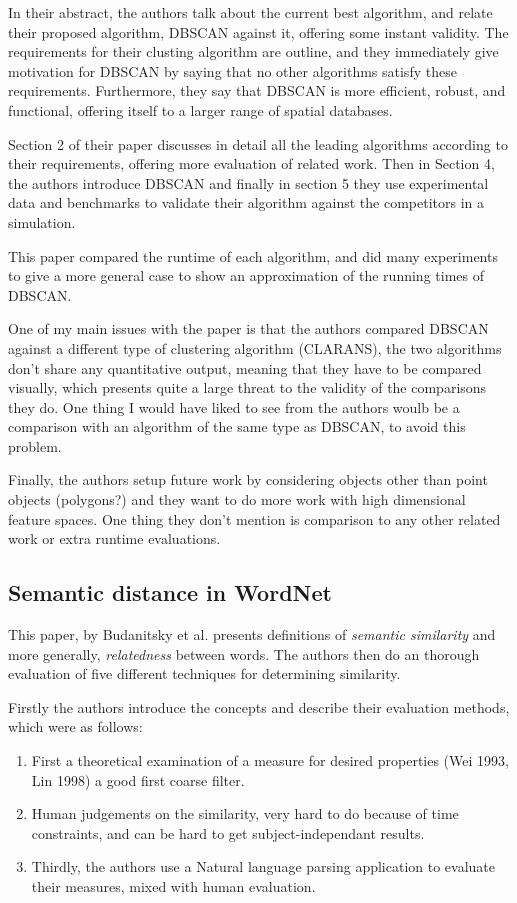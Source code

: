 \documentclass{article}
\numberwithin{equation}{section} %
\numberwithin{figure}{section} %
\numberwithin{table}{section} %
\begin{document}
In their abstract, the authors talk about the current best algorithm, and relate their proposed algorithm, DBSCAN against it, offering some instant validity.  The requirements for their clusting algorithm are outline, and they immediately give motivation for DBSCAN by saying that no other algorithms satisfy these requirements.  Furthermore, they say that DBSCAN is more efficient, robust, and functional, offering itself to a larger range of spatial databases.  

Section 2 of their paper discusses in detail all the leading algorithms according to their requirements, offering more evaluation of related work.  Then in Section 4, the authors introduce DBSCAN and finally in section 5 they use experimental data and benchmarks to validate their algorithm against the competitors in a simulation.  

This paper compared the runtime of each algorithm, and did many experiments to give a more general case to show an approximation of the running times of DBSCAN.

One of my main issues with the paper is that the authors compared DBSCAN against a different type of clustering algorithm (CLARANS), the two algorithms don't share any quantitative output, meaning that they have to be compared visually, which presents quite a large threat to the validity of the comparisons they do.  One thing I would have liked to see from the authors woulb be a comparison with an algorithm of the same type as DBSCAN, to avoid this problem.

Finally, the authors setup future work by considering objects other than point objects (polygons?) and they want to do more work with high dimensional feature spaces.  One thing they don't mention is comparison to any other related work or extra runtime evaluations.

\subsection{Semantic distance in WordNet}
This paper, by Budanitsky et al. presents definitions of \textit{semantic similarity} and more generally, \textit{relatedness} between words.  The authors then do an thorough evaluation of five different techniques for determining similarity.  

Firstly the authors introduce the concepts and describe their evaluation methods, which were as follows: 

\begin{enumerate}
  \item First a theoretical examination of a measure for desired properties (Wei 1993, Lin 1998) a good first coarse filter.
  \item Human judgements on the similarity, very hard to do because of time constraints, and can be hard to get subject-independant results.
  \item Thirdly, the authors use a Natural language parsing application to evaluate their measures, mixed with human evaluation.
\end{enumerate}
\end{document}
